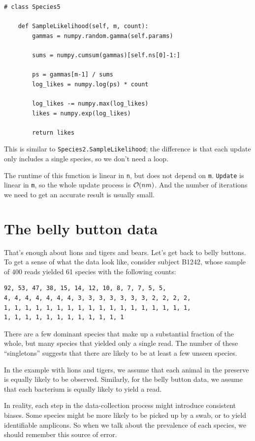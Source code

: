 \documentclass[12pt]{book}
\begin{document}
\begin{verbatim}
# class Species5

    def SampleLikelihood(self, m, count):
        gammas = numpy.random.gamma(self.params)

        sums = numpy.cumsum(gammas)[self.ns[0]-1:]

        ps = gammas[m-1] / sums
        log_likes = numpy.log(ps) * count

        log_likes -= numpy.max(log_likes)
        likes = numpy.exp(log_likes)

        return likes
\end{verbatim}

This is similar to {\tt Species2.SampleLikelihood}; the
difference is that each update only includes a single species,
so we don't need a loop.

The runtime of this function is linear in {\tt n}, but does not
depend on {\tt m}.  {\tt Update} is linear in {\tt m}, so the
whole update process is $\mathcal{O}(n m)$.  And the number of iterations
we need to get an accurate result is usually small.


\section{The belly button data}
\label{belly}

That's enough about lions and tigers and bears.
Let's get back to belly buttons.  To get a sense of what the
data look like, consider subject B1242,
whose sample of 400 reads yielded 61 species with the following
counts:

\begin{verbatim}
92, 53, 47, 38, 15, 14, 12, 10, 8, 7, 7, 5, 5, 
4, 4, 4, 4, 4, 4, 4, 3, 3, 3, 3, 3, 3, 3, 2, 2, 2, 2,
1, 1, 1, 1, 1, 1, 1, 1, 1, 1, 1, 1, 1, 1, 1, 1, 1, 1,
1, 1, 1, 1, 1, 1, 1, 1, 1, 1, 1, 1
\end{verbatim}

There are a few dominant species that make up a substantial
fraction of the whole, but many species that yielded only
a single read.  The number of these ``singletons'' suggests
that there are likely to be at least a few unseen species.

In the example with lions and tigers, we assume that each
animal in the preserve is equally likely to be observed.
Similarly, for the belly button data, we assume that each
bacterium is equally likely to yield a read.

In reality, each step in the data-collection
process might introduce consistent biases.  Some species might
be more likely to be picked up by a swab, or to yield identifiable
amplicons.  So when we talk about the prevalence of each species,
we should remember this source of error.
\end{document}
